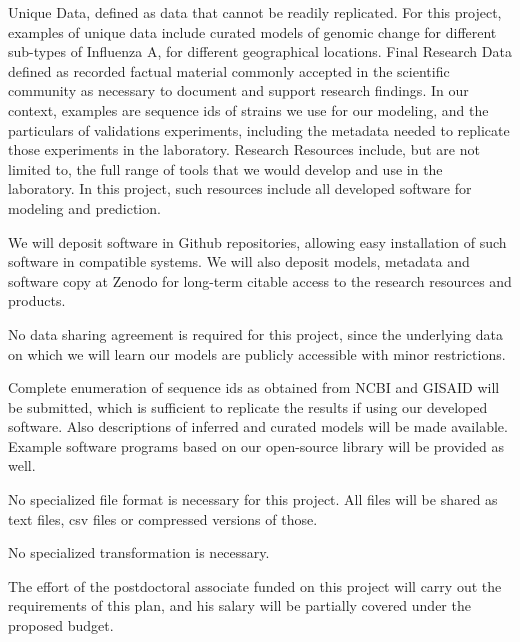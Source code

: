 \documentclass[onecolumn, compsoc,12pt]{IEEEtran}
\begin{document}
Unique Data, defined as data that cannot be readily replicated. For this project, examples of unique data include curated models of genomic change for different sub-types of Influenza A, for different geographical locations.
Final Research Data defined as recorded factual material commonly accepted in the scientific community as necessary to document and support research findings. In our context, examples are sequence ids of strains we use for our modeling, and the particulars of validations experiments, including the metadata needed to replicate those experiments in the laboratory.
Research Resources include, but are not limited to, the full range of tools that we would develop and use in the laboratory. In this project, such resources include all developed software for modeling and prediction.



              We will deposit software in Github repositories, allowing easy installation of such software in compatible systems. We will also deposit models, metadata and software copy at Zenodo for long-term citable access to the research resources and products.


              No data sharing agreement is required for this project, since the underlying data on which we will learn our models are publicly accessible with minor restrictions.


              Complete enumeration of sequence ids as obtained from NCBI and GISAID will be submitted, which is sufficient to replicate the results if using our developed software. Also descriptions of inferred and curated models will be made available. Example software programs based on our open-source library will be provided as well.


              No specialized file format is necessary for this project. All files will be shared as text files, csv files or compressed versions of those.


              No specialized transformation is necessary.


              The effort of the postdoctoral associate funded on this project will carry out the requirements of this plan, and his salary will be partially covered under the proposed budget.


\clearpage









\clearpage

%
%


\end{document}
